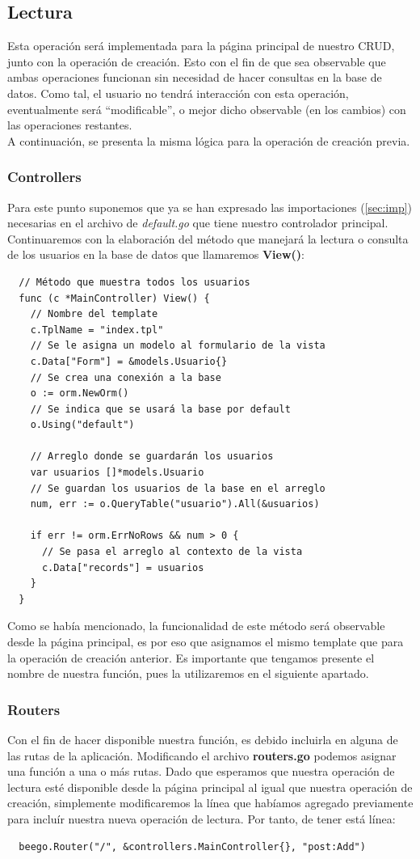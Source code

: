 \documentclass[12pt]{article}
\begin{document}
\subsection{Lectura}
Esta operación será implementada para la página principal de nuestro CRUD,
junto con la operación de creación. Esto con el fin de que sea observable
que ambas operaciones funcionan sin necesidad de hacer consultas en la base de
datos. Como tal, el usuario no tendrá interacción con esta operación, eventualmente
será ``modificable'', o mejor dicho observable (en los cambios) con las
operaciones restantes.\\

A continuación, se presenta la misma lógica para la operación
de creación previa.
\subsubsection{Controllers}
Para este punto suponemos que ya se han expresado las importaciones (\ref{sec:imp})
necesarias en el archivo de \textit{default.go} que tiene nuestro controlador
principal. Continuaremos con la elaboración del método que manejará la lectura
o consulta de los usuarios en la base de datos que llamaremos \textbf{View()}:

\begin{verbatim}
  // Método que muestra todos los usuarios
  func (c *MainController) View() {
    // Nombre del template
    c.TplName = "index.tpl"
    // Se le asigna un modelo al formulario de la vista
    c.Data["Form"] = &models.Usuario{}
    // Se crea una conexión a la base
    o := orm.NewOrm()
    // Se indica que se usará la base por default
    o.Using("default")

    // Arreglo donde se guardarán los usuarios
    var usuarios []*models.Usuario
    // Se guardan los usuarios de la base en el arreglo
    num, err := o.QueryTable("usuario").All(&usuarios)

    if err != orm.ErrNoRows && num > 0 {
      // Se pasa el arreglo al contexto de la vista
      c.Data["records"] = usuarios
    }
  }
\end{verbatim}
Como se había mencionado, la funcionalidad de este método será observable desde la página
principal, es por eso que asignamos el mismo template que para la operación de creación
anterior. Es importante que tengamos presente el nombre de nuestra función, pues la
utilizaremos en el siguiente apartado. 
\subsubsection{Routers}
Con el fin de hacer disponible nuestra función, es debido incluirla en alguna de las
rutas de la aplicación. Modificando el archivo \textbf{routers.go} podemos asignar una
función a una o más rutas. Dado que esperamos que nuestra operación de lectura esté disponible
desde la página principal al igual que nuestra operación de creación, simplemente modificaremos
la línea que habíamos agregado previamente para incluír nuestra nueva operación de lectura.
Por tanto, de tener está línea:
\begin{verbatim}
  beego.Router("/", &controllers.MainController{}, "post:Add")
\end{verbatim}
\end{document}
